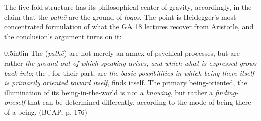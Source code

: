 The five-fold structure has its philosophical center of gravity, accordingly, in the claim that the \textit{pathē} are the ground of \textit{logos}. The point is Heidegger's most concentrated formulation of what the GA 18 lectures recover from Aristotle, and the conclusion's argument turns on it:
\begin{adjustwidth}{0.5in}{0in}
The  (\textit{pathē}) are not merely an annex of psychical processes, but are rather \textit{the ground out of which speaking arises, and which what is expressed grows back into}; the , for their part, are \textit{the basic possibilities in which being-there itself is primarily oriented toward itself}, finds itself. The primary being-oriented, the illumination of its being-in-the-world is not a \textit{knowing}, but rather a \textit{finding-oneself} that can be determined differently, according to the mode of being-there of a being. (BCAP, p. 176)
\end{adjustwidth}

